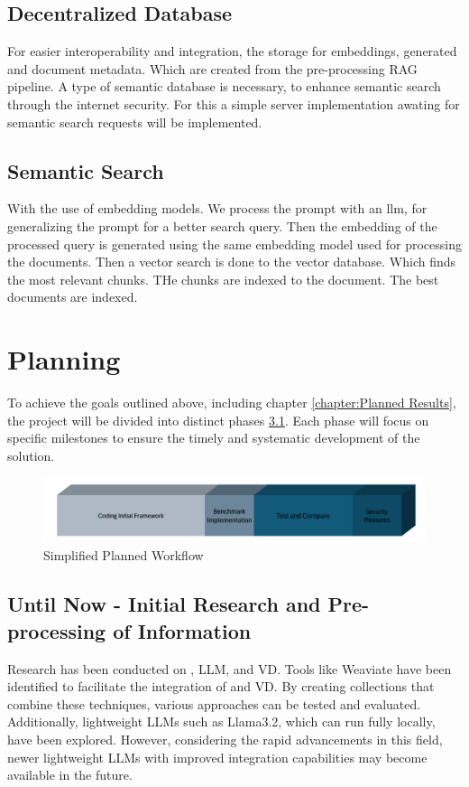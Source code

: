 \section{Decentralized Database}
For easier interoperability and integration, the storage for embeddings, generated and document metadata. Which are created from the pre-processing \ac{RAG} pipeline. A type of semantic database is necessary, to enhance semantic search through the internet security. For this a simple server implementation awating for semantic search requests will be implemented.

\section{Semantic Search}
With the use of embedding models. We process the prompt with an llm, for generalizing the prompt for a better search query. Then the embedding of the processed query is generated using the same embedding model used for processing the documents. Then a vector search is done to the vector database. Which finds the most relevant chunks. THe chunks are indexed to the document. The best documents are indexed.
\chapter{Planning}

To achieve the goals outlined above, including chapter \ref{chapter:Planned Results}, the project will be divided into distinct phases \ref{fig:planning}. Each phase will focus on specific milestones to ensure the timely and systematic development of the solution.

\begin{figure}[H]
    \centering
    \includegraphics[width=1\linewidth]{Images/planning.png}
    \caption{Simplified Planned Workflow}
    \label{fig:planning}
\end{figure}
\section{Until Now - Initial Research and Pre-processing of Information}
Research has been conducted on , \ac{LLM}, and \ac{VD}. Tools like Weaviate have been identified to facilitate the integration of  and \ac{VD}. By creating collections that combine these techniques, various approaches can be tested and evaluated. Additionally, lightweight \ac{LLM}s such as Llama3.2, which can run fully locally, have been explored. However, considering the rapid advancements in this field, newer lightweight \ac{LLM}s with improved integration capabilities may become available in the future.

